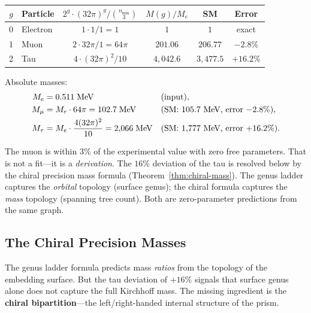 \documentclass[11pt, a4paper, openany]{book}
\newcounter{thm}[chapter]
\begin{document}
\medskip
\begin{center}
\renewcommand{\arraystretch}{1.4}
\begin{tabular}{clcccc}
\toprule
$g$ & Particle & $2^g \cdot (32\pi)^g / \binom{n_{\min}}{3}$
    & $M(g)/M_e$ & SM & Error \\
\midrule
0 & Electron & $1 \cdot 1 / 1 = 1$ & $1$ & $1$ & exact \\
1 & Muon     & $2 \cdot 32\pi / 1 = 64\pi$ & $201{.}06$
    & $206{.}77$ & $-2{.}8\%$ \\
2 & Tau      & $4 \cdot (32\pi)^2 / 10$
    & $4{,}042{.}6$ & $3{,}477{.}5$ & $+16{.}2\%$ \\
\bottomrule
\end{tabular}
\end{center}

\medskip
\noindent Absolute masses:
\begin{align}
  M_e &= 0{.}511\;\text{MeV} &&\text{(input)}, \notag\\
  M_\mu &= M_e \cdot 64\pi = 102{.}7\;\text{MeV}
    &&\text{(SM: } 105{.}7\text{ MeV, error } {-}2{.}8\%), \notag\\
  M_\tau &= M_e \cdot \frac{4(32\pi)^2}{10} = 2{,}066\;\text{MeV}
    &&\text{(SM: } 1{,}777\text{ MeV, error } {+}16{.}2\%).
    \label{eq:mass-predictions}
\end{align}

\begin{logicalreading}
The muon is within $3\%$ of the experimental value with zero free
parameters.  That is not a fit---it is a \emph{derivation}.
The $16\%$ deviation of the tau is resolved below by the chiral
precision mass formula (Theorem~\ref{thm:chiral-mass}).  The genus
ladder captures the \emph{orbital} topology (surface genus); the chiral
formula captures the \emph{mass} topology (spanning tree count).  Both
are zero-parameter predictions from the same graph.
\end{logicalreading}

\subsection{The Chiral Precision Masses}

The genus ladder formula predicts mass \emph{ratios} from the topology
of the embedding surface.  But the tau deviation of $+16\%$ signals
that surface genus alone does not capture the full Kirchhoff mass.
The missing ingredient is the \textbf{chiral bipartition}---the
left/right-handed internal structure of the prism.
\end{document}
